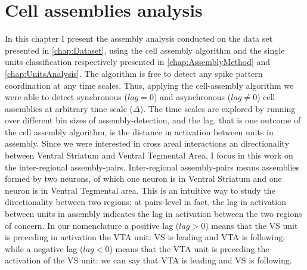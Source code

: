 \chapter{Cell assemblies analysis}
\label{chap:AssemblyAnalysis}
In this chapter I present the assembly analysis conducted on the data set presented in \autoref{chap:Dataset}, using the cell assembly algorithm and the single units classification respectively presented in \autoref{chap:AssemblyMethod} and \autoref{chap:UnitsAnalysis}.
The algorithm is free to detect any spike pattern coordination at any time scales.
Thus, applying the cell-assembly algorithm we were able to detect synchronous ($lag=0$) and asynchronous ($lag\neq 0$) cell assemblies at arbitrary time scale ($\Delta$). The time scales are explored by running over different bin sizes of assembly-detection, and the lag, that is one outcome of the cell assembly algorithm, is the distance in activation between units in assembly.
Since we were interested in cross areal interactions an directionality between Ventral Striatum and Ventral Tegmental Area, I focus in this work on the inter-regional assembly-pairs. Inter-regional assembly-pairs means assemblies formed by two neurons, of which one neuron is in Ventral Striatum and one neuron is in Ventral Tegmental area. This is  an intuitive way to study the directionality between two regions: at pairs-level in fact, the lag in activation between units in assembly indicates the lag in activation between the two regions of concern. In our nomenclature a positive lag ($lag>0$) means that the VS unit is preceding in activation the VTA unit: VS is leading and VTA is following; while a negative lag ($lag<0$) means that the VTA unit is preceding the activation of the VS unit: we can say that VTA is leading and VS is following. 

